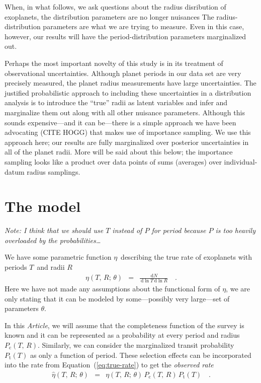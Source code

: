 \documentclass[12pt,preprint]{aastex}
\newcommand{\paper}{\emph{Article}}
\newcommand{\Eq}[1]{Equation~(\ref{eq:#1})}
\newcommand{\eq}[1]{\Eq{#1}}
\newcommand{\eqlabel}[1]{\label{eq:#1}}
\newcommand{\dd}{\ensuremath{\,\mathrm{d}}}
\newcommand{\rate}{\ensuremath{\eta}}
\newcommand{\ratepars}{\ensuremath{\theta}}
\newcommand{\obs}[1]{\ensuremath{\hat{#1}}}
\newcommand{\radius}{\ensuremath{R}}
\newcommand{\period}{\ensuremath{T}}
\newcommand{\completeness}{\ensuremath{P_\mathrm{c}}}
\newcommand{\transitprob}{\ensuremath{P_\mathrm{t}}}
\begin{document}
When, in what follows, we ask questions about the radius disribution of
exoplanets, the distribution parameters are no longer nuisances The
radius-distribution parameters are what we are trying to measure.
Even in this case, however, our results will have the period-distribution
parameters marginalized out.

Perhaps the most important novelty of this study is in its treatment of
observational uncertainties.
Although planet periods in our data set are very precisely measured, the
planet radius measurements have large uncertainties.
The justified probabilistic approach to including these uncertainties in a
distribution analysis is to introduce the ``true'' radii as latent variables
and infer and marginalize them out along with all other nuisance parameters.
Although this sounds expensive---and it can be---there is a simple approach
we have been advocating (CITE HOGG) that makes use of importance sampling.
We use this approach here; our results are fully marginalized over posterior
uncertainties in all of the planet radii.
More will be said about this below; the importance sampling looks like a
product over data points of sums (averages) over individual-datum radius
samplings.

\section{The model}

\emph{Note: I think that we should use $T$ instead of $P$ for period because
$P$ is too heavily overloaded by the probabilities\ldots}

We have some parametric function \rate\ describing the true rate of exoplanets
with periods \period\ and radii \radius
\begin{eqnarray}\eqlabel{true-rate}
\rate (\period,\,\radius;\,\ratepars)
&=& \frac{\dd N}{\dd\ln\period\dd\ln\radius}\quad.
\end{eqnarray}
Here we have not made any assumptions about the functional form of \rate, we
are only stating that it can be modeled by some---possibly very large---set of
parameters \ratepars.

In this \paper, we will assume that the completeness function of the survey is
known and it can be represented as a probability at every period and radius
$\completeness (\period,\,\radius)$.
Similarly, we can consider the marginalized transit probability $\transitprob
(\period)$ as only a function of period.
These selection effects can be incorporated into the rate from \eq{true-rate}
to get the \emph{observed rate}
\begin{eqnarray}\eqlabel{obs-rate}
\obs{\rate} (\period,\,\radius;\,\ratepars)
&=& \rate (\period,\,\radius;\,\ratepars)\,\completeness(\period,\,\radius)\,
\transitprob(\period)\quad.
\end{eqnarray}
\end{document}
